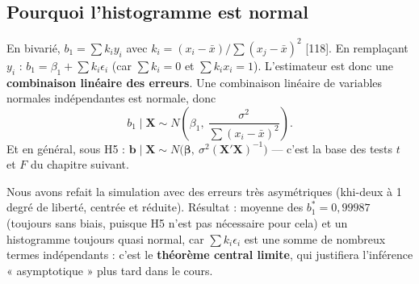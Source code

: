 \documentclass[11pt,a4paper]{article}
\newcommand{\vX}{\mathbf{X}}
\newcommand{\vb}{\mathbf{b}}
\newcommand{\vbeta}{\bm{\beta}}
\newcommand{\XtXi}{(\vX'\vX)^{-1}}
\begin{document}
\subsection{Pourquoi l'histogramme est normal}
En bivarié, $b_1=\sum k_iy_i$ avec $k_i=(x_i-\bar x)/\sum(x_j-\bar x)^2$ [118]. En remplaçant $y_i$ : $b_1=\beta_1+\sum k_i\epsilon_i$ (car $\sum k_i=0$ et $\sum k_ix_i=1$). L'estimateur est donc une \textbf{combinaison linéaire des erreurs}. Une combinaison linéaire de variables normales indépendantes est normale, donc
\[
b_1\mid\vX\sim N\!\left(\beta_1,\ \frac{\sigma^2}{\sum(x_i-\bar x)^2}\right).
\]
Et en général, sous H5 : $\vb\mid\vX\sim N\big(\vbeta,\ \sigma^2\XtXi\big)$ — c'est la base des tests $t$ et $F$ du chapitre suivant.

\begin{intuition}[title={Et si les erreurs ne sont pas normales ?}]
Nous avons refait la simulation avec des erreurs très asymétriques (khi-deux à 1 degré de liberté, centrée et réduite). Résultat : moyenne des $b_1^*=0{,}99987$ (toujours sans biais, puisque H5 n'est pas nécessaire pour cela) et un histogramme toujours quasi normal, car $\sum k_i\epsilon_i$ est une somme de nombreux termes indépendants : c'est le \textbf{théorème central limite}, qui justifiera l'inférence « asymptotique » plus tard dans le cours.
\end{intuition}

\end{document}
